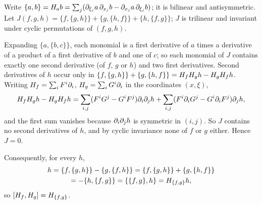 \subsection*{}
Write $\{a,b\}=H_{a}b=\sum_j(\partial_{\xi_j}a\,\partial_{x_j}b-\partial_{x_j}a\,\partial_{\xi_j}b)$; it is bilinear and
antisymmetric. Let $J(f,g,h)=\{f,\{g,h\}\}+\{g,\{h,f\}\}+\{h,\{f,g\}\}$; $J$ is trilinear and invariant under
cyclic permutations of $(f,g,h)$.

Expanding $\{a,\{b,c\}\}$, each monomial is a first derivative of $a$ times a derivative of a
product of a first derivative of $b$ and one of $c$; so each monomial of $J$ contains exactly one
second derivative (of $f$, $g$ or $h$) and two first derivatives. Second derivatives of $h$
occur only in $\{f,\{g,h\}\}+\{g,\{h,f\}\}=H_{f}H_{g}h-H_{g}H_{f}h$. Writing $H_{f}=\sum_iF^i\partial_i$,
$H_{g}=\sum_iG^i\partial_i$ in the coordinates $(x,\xi)$,
\begin{equation*}
  H_{f}H_{g}h-H_{g}H_{f}h=\sum_{i,j}(F^iG^j-G^iF^j)\partial_i\partial_jh+\sum_{i,j}(F^i\partial_iG^j-G^i\partial_iF^j)\partial_jh,
\end{equation*}
and the first sum vanishes because $\partial_i\partial_jh$ is symmetric in $(i,j)$. So $J$ contains no second
derivatives of $h$, and by cyclic invariance none of $f$ or $g$ either. Hence $J=0$.

Consequently, for every $h$,
\begin{multline*}
  [\Ham f,\Ham g]h=\{f,\{g,h\}\}-\{g,\{f,h\}\}=\{f,\{g,h\}\}+\{g,\{h,f\}\}\\
  =-\{h,\{f,g\}\}=\{\{f,g\},h\}=\Ham{\{f,g\}}h,
\end{multline*}
so $[H_{f},H_{g}]=H_{\{f,g\}}$.

